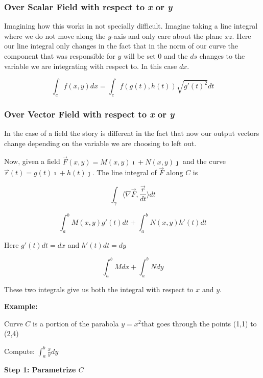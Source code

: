 \subsubsection{Over Scalar Field with respect to \emph{x} or \emph{y}}

Imagining how this works in not specially difficult. Imagine taking a line integral where we do not move 
along the \(y\)-axis and only care about the plane \(xz\). Here our line integral only changes in the fact that in 
the norm of our curve the component that was responsible for \(y\) will be set 0 and the \(ds\) changes to 
the variable we are integrating with respect to. In this case \(dx\).

\[
\int_{c} f(x,y)dx = \int_{c} f(g(t), h(t)) \sqrt{g'(t)^2}dt 
\]

\subsubsection{Over Vector Field with respect to \emph{x} or \emph{y}}

In the case of a field the story is different in the fact that now our output vectors change depending on the 
variable we are choosing to left out.
\vspace{\baselineskip}

Now, given a field \(\vec{F}(x,y) = M(x,y)\imath + N(x,y)\jmath\) and the curve \(\vec{r}(t) = g(t)\imath + h(t)\jmath\). 
The line integral of \(\vec{F}\) along \(C\) is 

\[
\int_\gamma \langle \nabla \vec{F}, \frac{\vec{r}}{dt} \rangle dt
\]

\[
\int_{a}^{b} M(x,y)g'(t)dt + \int_{a}^{b} N(x,y)h'(t)dt
\]

Here \(g'(t)dt = dx\) and \(h'(t)dt = dy\)

\[
\int_{a}^{b} Mdx + \int_{a}^{b} Ndy
\]

These two integrals give us both the integral with respect to \(x\) and \(y\).
\vspace{\baselineskip}

\textbf{Example:}
\vspace{\baselineskip}

Curve \(C\) is a portion of the parabola \(y = x^2\)that goes through the points (1,1) to (2,4)
\vspace{\baselineskip}

Compute: \(\int_{a}^{b} \frac{x}{y} dy\)
\vspace{\baselineskip}

\textbf{Step 1: Parametrize \(C\)}

